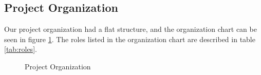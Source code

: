 \subsection{Project Organization}
Our project organization had a flat structure, and the organization chart can be seen in figure \ref{fig:orgchart}. The roles listed in the organization chart are described in table \ref{tab:roles}.

\begin{figure}[htb]
	\noindent{}
	\caption{Project Organization\label{fig:orgchart}}
\end{figure}

